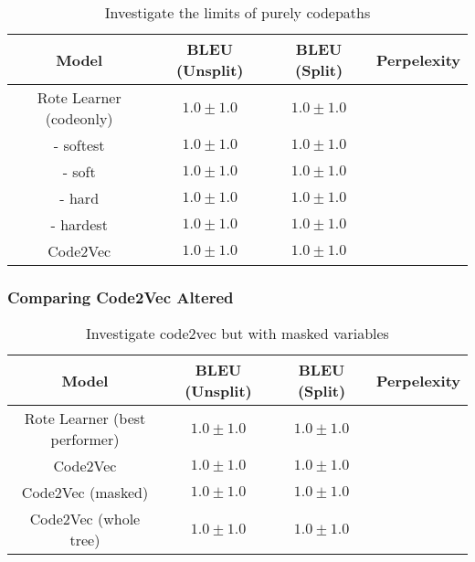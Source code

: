 \begin{table}[h!]
\begin{center}
\begin{tabular}{ c | c | c | c }
    Model                             & BLEU (Unsplit)  & BLEU (Split)    & Perpelexity \\
    \hline
    Rote Learner (codeonly)           & $1.0 \pm 1.0 $  & $1.0 \pm 1.0 $  & \\
    - softest                         & $1.0 \pm 1.0 $  & $1.0 \pm 1.0 $  & \\
    - soft                            & $1.0 \pm 1.0 $  & $1.0 \pm 1.0 $  & \\
    - hard                            & $1.0 \pm 1.0 $  & $1.0 \pm 1.0 $  & \\
    - hardest                         & $1.0 \pm 1.0 $  & $1.0 \pm 1.0 $  & \\
    \hline
    Code2Vec                          & $1.0 \pm 1.0 $  & $1.0 \pm 1.0 $  &  \\
    \hline
\end{tabular}
\caption {Investigate the limits of purely codepaths}
\label{table:name_code2vec_solo}
\end{center}
\end{table}


\subsubsection{Comparing Code2Vec Altered} %
\label{ssub:comparing_code2vec_altered}


\begin{table}[h!]
\begin{center}
\begin{tabular}{ c | c | c | c }
    Model                             & BLEU (Unsplit)  & BLEU (Split)    & Perpelexity \\
    \hline
    Rote Learner (best performer)           & $1.0 \pm 1.0 $  & $1.0 \pm 1.0 $  & \\
    \hline
    Code2Vec                             & $1.0 \pm 1.0 $  & $1.0 \pm 1.0 $  &  \\
    Code2Vec (masked)                    & $1.0 \pm 1.0 $  & $1.0 \pm 1.0 $  &  \\
    Code2Vec (whole tree)                & $1.0 \pm 1.0 $  & $1.0 \pm 1.0 $  &  \\
    \hline
\end{tabular}
\caption {Investigate code2vec but with masked variables}
\label{table:name_baseline}
\end{center}
\end{table}


